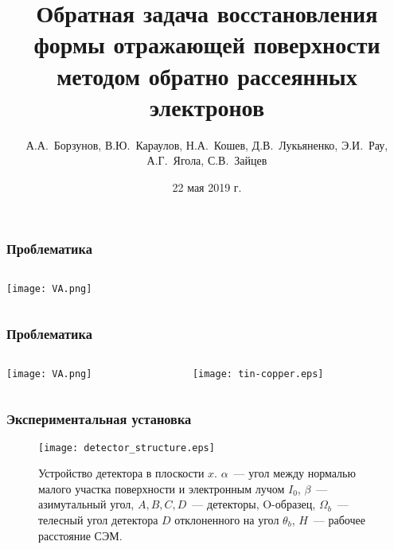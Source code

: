 \documentclass{beamer}
\title{Обратная задача восстановления формы отражающей поверхности методом обратно рассеянных электронов}
\author{А.А.~Борзунов, В.Ю.~Караулов, Н.А.~Кошев, Д.В.~Лукьяненко, Э.И.~Рау, А.Г.~Ягола, С.В.~Зайцев}
\institute{Московский Государственный Университет им. М.В. Ломоносова}
\date{22 мая 2019 г.}
\begin{document}
\frame{\titlepage}

\begin{frame}
    \frametitle{Проблематика}
    \begin{columns}
        \begin{column}{0.40\textwidth}
            \texttt{[image: VA.png]}
        \end{column}
        \begin{column}{0.6\textwidth}
        \end{column}
    \end{columns}
\end{frame}

\begin{frame}
    \frametitle{Проблематика}
    \begin{columns}
        \begin{column}{0.40\textwidth}
            \texttt{[image: VA.png]}
        \end{column}
        \begin{column}{0.6\textwidth}
            \texttt{[image: tin-copper.eps]}
        \end{column}
    \end{columns}
\end{frame}

\begin{frame}
    \frametitle{Экспериментальная установка}
    \begin{figure}
        \texttt{[image: detector\_structure.eps]}
        \caption{Устройство детектора в плоскости $x$. $\alpha$~--- угол между нормалью малого участка поверхности и электронным лучом $I_0$, $\beta$~--- азимутальный угол, $A,B,C,D$~--- детекторы, O-образец, $\Omega_{b}$~--- телесный угол детектора $D$ отклоненного на угол $\theta_b$, $H$~--- рабочее расстояние СЭМ.}
        {\label{fig:detector_structure}}%
    \end{figure}
\end{frame}
\end{document}
